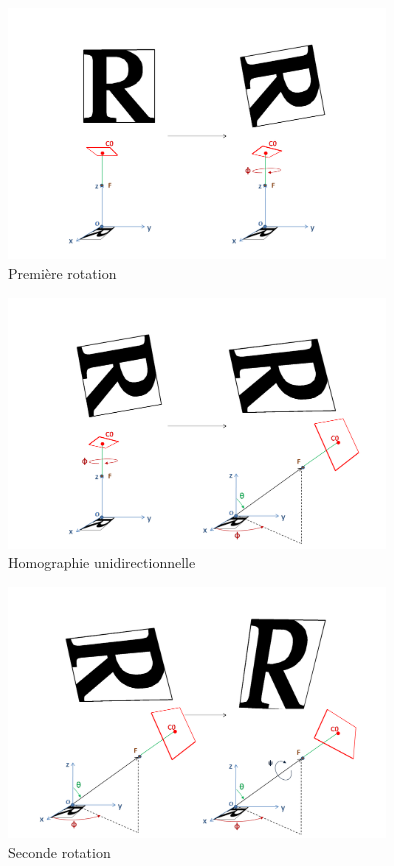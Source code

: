 \documentclass[c,12pt]{beamer}
\begin{document}
  \begin{frame}
  \begin{figure}
   \centering
   \includegraphics[width=100mm]{beamer_decompo1_rotation_phi.png}
   \caption{Première rotation}
  \end{figure}
  \end{frame}

  \begin{frame}
  \begin{figure}
   \centering
   \includegraphics[width=100mm]{beamer_decompo2_homo_part.png}
   \caption{Homographie unidirectionnelle}
  \end{figure}
  \end{frame}

  \begin{frame}
  \begin{figure}
   \centering
   \includegraphics[width=100mm]{beamer_decompo3_rotation_psi.png}
   \caption{Seconde rotation}
  \end{figure}
  \end{frame}
\end{document}
